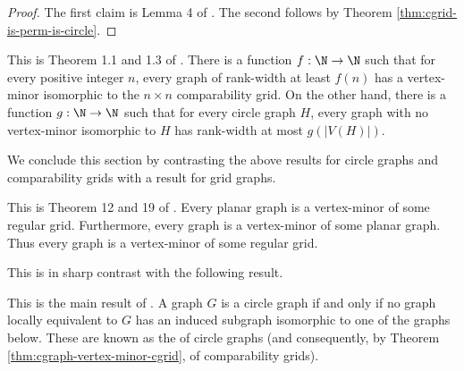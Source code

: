 \begin{proof}
The first claim is Lemma 4 of \cite{circle-graphs}. The second follows by Theorem \ref{thm:cgrid-is-perm-is-circle}.
\end{proof}

\begin{theorem}
\label{thm:rank-width-vertex-minor-cgrid}
This is Theorem 1.1 and 1.3 of \cite{GEELEN202393}. There is a function $f: \N \to \N$ such that for every positive integer $n$, every graph of rank-width at least $f(n)$ has a vertex-minor isomorphic to the $n \times n$ comparability grid. On the other hand, there is a function $g: \N \to \N$ such that for every circle graph $H$, every graph with no vertex-minor isomorphic to $H$ has rank-width at most $g(|V(H)|)$.
\end{theorem}

We conclude this section by contrasting the above results for circle graphs and comparability grids with a result for grid graphs.

\begin{theorem}
\label{thm:every-graph-vertex-minor-of-grid}
This is Theorem 12 and 19 of \cite{campbell2024treewidthhadwigernumberinduced}. Every planar graph is a vertex-minor of some regular grid. Furthermore, every graph is a vertex-minor of some planar graph. Thus every graph is a vertex-minor of some regular grid.
\end{theorem}

This is in sharp contrast with the following result.

\begin{theorem}
\label{thm:forbidden-minor-of-cgraph}
This is the main result of \cite{BOUCHET1994107}. A graph $G$ is a circle graph if and only if no graph locally equivalent to $G$
has an induced subgraph isomorphic to one of the graphs below. These are known as the  of circle graphs (and consequently, by Theorem \ref{thm:cgraph-vertex-minor-cgrid}, of comparability grids).

\end{theorem}